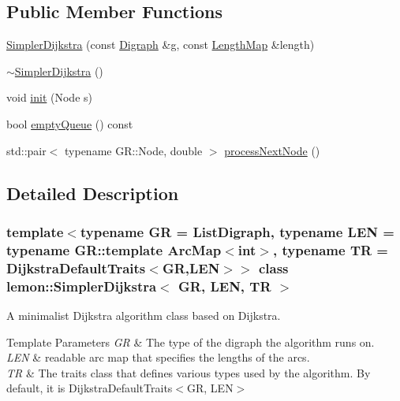 \subsection*{Public Member Functions}
\begin{DoxyCompactItemize}
\item 
\hyperlink{classlemon_1_1_simpler_dijkstra_aafa6d31f7d5de94342454613f321aff8}{Simpler\+Dijkstra} (const \hyperlink{classlemon_1_1_simpler_dijkstra_ac19103e2c76d2258f7507dd5921d814d}{Digraph} \&g, const \hyperlink{classlemon_1_1_simpler_dijkstra_adfe5498ef0a7699daf396dd6c4b7dfb6}{Length\+Map} \&length)
\item 
\hyperlink{classlemon_1_1_simpler_dijkstra_a4f5e5b5fdbdc7bcb61c41cbf6caf4c9f}{$\sim$\+Simpler\+Dijkstra} ()
\item 
void \hyperlink{classlemon_1_1_simpler_dijkstra_a714103f8b8c32f17211bdd0dae12fe4e}{init} (Node s)
\item 
bool \hyperlink{classlemon_1_1_simpler_dijkstra_a5f76dcaec68bd9b4e9df63a32565ebcc}{empty\+Queue} () const
\item 
std\+::pair$<$ typename G\+R\+::\+Node, double $>$ \hyperlink{classlemon_1_1_simpler_dijkstra_a84a7dcefca1d2a82a6af236dc082d77a}{process\+Next\+Node} ()
\end{DoxyCompactItemize}


\subsection{Detailed Description}
\subsubsection*{template$<$typename GR = List\+Digraph, typename L\+EN = typename G\+R\+::template Arc\+Map$<$int$>$, typename TR = Dijkstra\+Default\+Traits$<$\+G\+R,\+L\+E\+N$>$$>$\newline
class lemon\+::\+Simpler\+Dijkstra$<$ G\+R, L\+E\+N, T\+R $>$}

A minimalist Dijkstra algorithm class based on Dijkstra. 


\begin{DoxyTemplParams}{Template Parameters}
{\em GR} & The type of the digraph the algorithm runs on. \\
\hline
{\em L\+EN} & readable arc map that specifies the lengths of the arcs. \\
\hline
{\em TR} & The traits class that defines various types used by the algorithm. By default, it is Dijkstra\+Default\+Traits$<$GR, L\+EN$>$ \\
\hline
\end{DoxyTemplParams}


